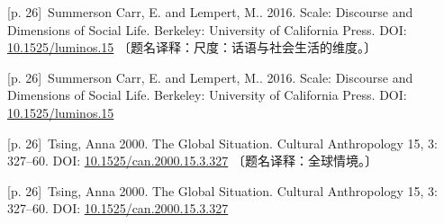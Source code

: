 \documentclass[10pt,a4paper]{article}
\begin{document}
\noindent\begin{minipage}{\textwidth}\begin{minipage}[t]{\dimexpr.5\textwidth-4mm\relax}\noindent\begin{minipage}[t]{\linewidth}{\scriptsize\color{gray} [p. 26]}\ Summerson Carr, E. and Lempert, M.. 2016. Scale: Discourse and Dimensions of Social Life. Berkeley: University of California Press. DOI: \url{10.1525/luminos.15} 〔题名译释：尺度：话语与社会生活的维度。〕\par\end{minipage}\par\end{minipage}\hfill\begin{minipage}[t]{\dimexpr.5\textwidth-4mm\relax}\noindent\begin{minipage}[t]{\linewidth}{\scriptsize\color{gray} [p. 26]}\ Summerson Carr, E. and Lempert, M.. 2016. Scale: Discourse and Dimensions of Social Life. Berkeley: University of California Press. DOI: \url{10.1525/luminos.15}\par\end{minipage}\par\end{minipage}\end{minipage}\par
\noindent\begin{minipage}{\textwidth}\begin{minipage}[t]{\dimexpr.5\textwidth-4mm\relax}\noindent\begin{minipage}[t]{\linewidth}{\scriptsize\color{gray} [p. 26]}\ Tsing, Anna 2000. The Global Situation. Cultural Anthropology 15, 3: 327–60. DOI: \url{10.1525/can.2000.15.3.327} 〔题名译释：全球情境。〕\par\end{minipage}\par\end{minipage}\hfill\begin{minipage}[t]{\dimexpr.5\textwidth-4mm\relax}\noindent\begin{minipage}[t]{\linewidth}{\scriptsize\color{gray} [p. 26]}\ Tsing, Anna 2000. The Global Situation. Cultural Anthropology 15, 3: 327–60. DOI: \url{10.1525/can.2000.15.3.327}\par\end{minipage}\par\end{minipage}\end{minipage}\par
\end{document}

